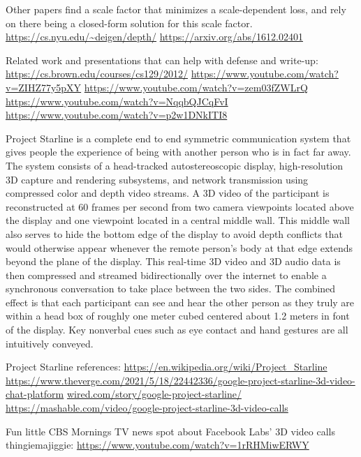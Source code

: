 Other papers find a scale factor that minimizes a scale-dependent loss, and rely on there being a closed-form solution for this scale factor.
\url{https://cs.nyu.edu/~deigen/depth/}
\url{https://arxiv.org/abs/1612.02401}

Related work and presentations that can help with defense and write-up:
\url{https://cs.brown.edu/courses/cs129/2012/}
\url{https://www.youtube.com/watch?v=ZIHZ77y5pXY}
\url{https://www.youtube.com/watch?v=zem03fZWLrQ}
\url{https://www.youtube.com/watch?v=NqqbQJCqFvI}
\url{https://www.youtube.com/watch?v=p2w1DNkITI8}

Project Starline is a complete end to end symmetric communication system that gives people the experience of being with another person who is in fact far away. The system consists of a head-tracked autostereoscopic display, high-resolution 3D capture and rendering subsystems, and network transmission using compressed color and depth video streams. A 3D video of the participant is reconstructed at 60 frames per second from two camera viewpoints located above the display and one viewpoint located in a central middle wall. This middle wall also serves to hide the bottom edge of the display to avoid depth conflicts that would otherwise appear whenever the remote person's body at that edge extends beyond the plane of the display. This real-time 3D video and 3D audio data is then compressed and streamed bidirectionally over the internet to enable a synchronous conversation to take place between the two sides. The combined effect is that each participant can see and hear the other person as they truly are within a head box of roughly one meter cubed centered about 1.2 meters in font of the display. Key nonverbal cues such as eye contact and hand gestures are all intuitively conveyed. 

Project Starline references:
\url{https://en.wikipedia.org/wiki/Project_Starline}
\url{https://www.theverge.com/2021/5/18/22442336/google-project-starline-3d-video-chat-platform}
\url{wired.com/story/google-project-starline/}
\url{https://mashable.com/video/google-project-starline-3d-video-calls}

Fun little CBS Mornings TV news spot about Facebook Labs' 3D video calls thingiemajiggie:
\url{https://www.youtube.com/watch?v=1rRHMiwERWY}